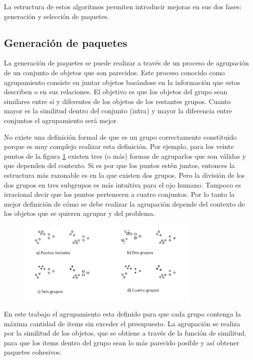 La estructura de estos algoritmos permiten introducir mejoras en sus dos fases: generación y selección de paquetes.
\subsection{Generación de paquetes}
La generación de paquetes se puede realizar a través de un proceso de agrupación de un conjunto de objetos que son parecidos. Este proceso conocido como agrupamiento consiste en juntar objetos basándose en la información que estos describen o en sus relaciones. El objetivo es que los objetos del grupo sean similares entre sí y diferentes de los objetos de los restantes grupos. Cuanto mayor es la similitud dentro del conjunto (intra) y mayor la diferencia entre conjuntos el agrupamiento será mejor.

No existe una definición formal de que es un grupo correctamente constituido porque es muy complejo realizar esta definición. Por ejemplo, para los veinte puntos de la figura \ref{res:img-howToCluster} existen tres (o más) formas de agruparlos que son válidas y que dependen del contexto. Si es por que los puntos estén juntos, entonces la estructura más razonable es en la que existen dos grupos. Pero la división de los dos grupos en tres subgrupos es más intuitiva para el ojo humano. Tampoco es irracional decir que los puntos pertenecen a cuatro conjuntos. Por lo tanto la mejor definición de cómo se debe realizar la agrupación depende del contexto de los objetos que se quieren agrupar y del problema.

\begin{figure}[H]
  \centering
   \includegraphics[width=0.8\textwidth]{img/howToCluster.png}
   \caption{}
   \label{res:img-howToCluster}
\end{figure}
En este trabajo el agrupamiento esta definido para que cada grupo contenga la máxima cantidad de items sin exceder el presupuesto. La agrupación se realiza por la similitud de los objetos, que se obtiene a través de la función de similitud, para que los items dentro del grupo sean lo más parecido posible y así obtener paquetes cohesivos.

